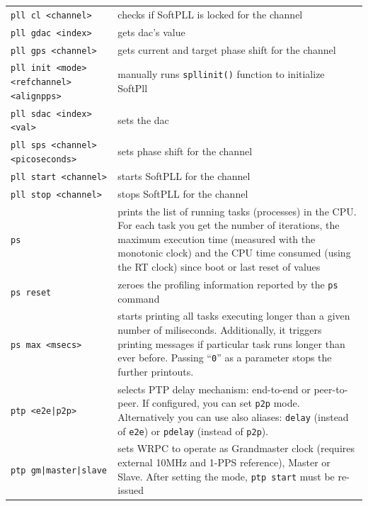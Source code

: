 \documentclass[a4paper, 12pt]{article}
\renewcommand{\_}{\underscore\allowbreak}
\newcommand{\code}[1]{\texttt{#1}}
\begin{document}
\begin{longtable}{  p{7.5cm}  p{7cm} }
  \code{pll cl <channel>} & checks if SoftPLL is locked for the channel \\

  \code{pll gdac <index>} & gets dac's value \\

  \code{pll gps <channel>} & gets current and target phase shift for the
    channel \\

  \code{pll init <mode> <ref\_channel> <align\_pps>} & manually runs
    \texttt{spll\_init()} function to initialize SoftPll  \\

  \code{pll sdac <index> <val>} & sets the dac \\

  \code{pll sps <channel> <picoseconds>} & sets phase shift for the channel \\

  \code{pll start <channel>} & starts SoftPLL for the channel \\

  \code{pll stop <channel>} & stops SoftPLL for the channel \\

  \code{ps} & prints the list of running tasks (processes) in the CPU. For
    each task you get the number of iterations, the maximum execution time
    (measured with the monotonic clock) and the CPU time consumed (using
    the RT clock) since boot or last reset of values \\

  \code{ps reset} & zeroes the profiling information reported by the \code{ps}
    command \\

  \code{ps max <msecs>} & starts printing all tasks executing longer than
    a given number of miliseconds. Additionally, it triggers printing messages
    if particular task runs longer than ever before. Passing ``\code{0}'' as
    a parameter stops the further printouts. \\

  \code{ptp <e2e|p2p>} & selects PTP delay mechanism: end-to-end or peer-to-peer.
    If configured, you can set \texttt{p2p} mode. Alternatively you can use also
    aliases: \texttt{delay} (instead of \texttt{e2e}) or \texttt{pdelay}
    (instead of \texttt{p2p}).\\

  \code{ptp gm|master|slave} & sets WRPC to operate as Grandmaster clock
    (requires external 10MHz and 1-PPS reference), Master or Slave. After
    setting the mode, \texttt{ptp start} must be re-issued \\


\end{longtable}
\end{document}
